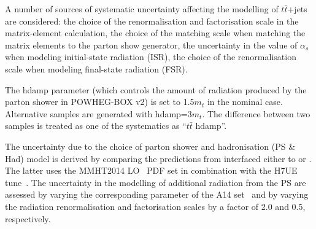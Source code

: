 A number of sources of systematic uncertainty affecting the modelling of $t\bar{t}$+jets are considered: the choice of the renormalisation and factorisation scale in the matrix-element calculation, the choice of the matching scale when matching the matrix elements to the parton show generator, the uncertainty in the value of $\alpha_s$ when modeling initial-state radiation (ISR), the choice of the renormalisation scale when modeling final-state radiation (FSR).

The hdamp parameter (which controls the amount of radiation produced by the parton shower in
POWHEG-BOX v2) is set to 1.5$m_t$ in the nominal case. Alternative samples are generated with hdamp=3$m_t$. The
difference between two samples is treated as one of the systematics as ``$t\bar{t}$ hdamp''. 

The uncertainty due to the choice of parton shower and hadronisation (PS \& Had) model is derived 
by comparing the predictions from {\powheg} interfaced either to {\pythiaeight} or {}.
The latter uses the MMHT2014 LO~\cite{Harland-Lang:2014zoa} PDF set in combination with the H7UE tune~\cite{Bellm:2015jjp}.
The uncertainty in the modelling of additional radiation from the PS are assessed by
varying the corresponding parameter of the A14 set~\cite{ATL-PHYS-PUB-2016-004} and by varying the radiation renormalisation and factorisation scales
by a factor of 2.0 and 0.5, respectively. 


